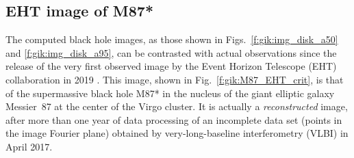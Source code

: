 \subsection{EHT image of M87*} \label{s:gik:M87_image}

The computed black hole images, as those shown in Figs.~\ref{f:gik:img_disk_a50}
and \ref{f:gik:img_disk_a95}, can be contrasted with actual observations since
the release of the very first observed image by the
Event Horizon Telescope (EHT) collaboration in 2019 \cite{EHT19a,Wielg_al20}. This image, shown in Fig.~\ref{f:gik:M87_EHT_crit}, is that
of the supermassive black hole M87* in the nucleus of
the giant elliptic galaxy Messier~87 at the center of the Virgo cluster. It is actually
a \emph{reconstructed} image, after more than one year of data processing
of an incomplete data set (points in the image Fourier plane) obtained
by very-long-baseline interferometry (VLBI) in April 2017.

